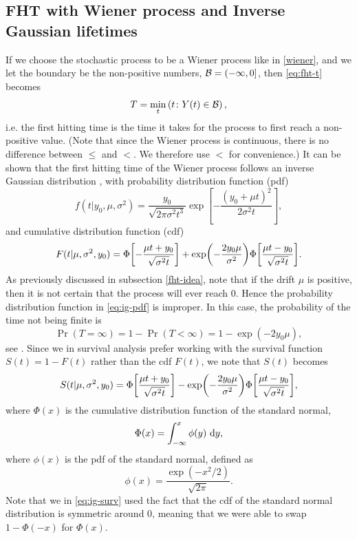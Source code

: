 \subsection{FHT with Wiener process and Inverse Gaussian lifetimes}
If we choose the stochastic process to be a Wiener process like in \eqref{wiener}, and we let the boundary be the non-positive numbers, $\mathcal{B}=(-\infty,0]$, then \eqref{eq:fht-t} becomes
\begin{equation}
    T=\min_t\left(t\colon Y(t)\in\mathcal{B}\right),
\end{equation}
i.e. the first hitting time is the time it takes for the process to first reach a non-positive value.
(Note that since the Wiener process is continuous, there is no difference between $\leq$ and $<$. We therefore use $<$ for convenience.)
It can be shown that the first hitting time of the Wiener process follows an inverse Gaussian distribution \citep{chhikara1988}, with probability distribution function (pdf)
\begin{equation}
\label{eq:ig-pdf}
    f(t|y_0,\mu,\sigma^2)=\frac{y_0}{\sqrt{2\pi\sigma^2t^3}}\exp\left[-\frac{(y_0+\mu t)^2}{2\sigma^2t}\right],
\end{equation}
and cumulative distribution function (cdf)
\begin{equation}
\label{eq:ig-cdf}
    F(t|\mu,\sigma^2,y_0)=\Phi\sqb*{-\frac{\mu t+y_0}{\sqrt{\sigma^2t}}}+\exp\p*{-\frac{2y_0\mu}{\sigma^2}}\Phi\sqb*{\frac{\mu t-y_0}{\sqrt{\sigma^2t}}}.
\end{equation}
As previously discussed in subsection \ref{fht-idea}, note that if the drift $\mu$ is positive, then it is not certain that the process will ever reach 0. Hence the probability distribution function in \eqref{eq:ig-pdf} is improper. In this case, the probability of the time not being finite is
\begin{equation*}
    \Pr{(T=\infty)}=1-\Pr{(T<\infty)}=1-\exp{(-2y_0\mu)},
\end{equation*}
see \citet{cox1965}. Since we in survival analysis prefer working with the survival function $S(t)=1-F(t)$ rather than the cdf $F(t)$, we note that $S(t)$ becomes
\begin{equation}
\label{eq:ig-surv}
    S(t|\mu,\sigma^2,y_0)=\Phi\sqb*{\frac{\mu t+y_0}{\sqrt{\sigma^2t}}}-\exp\p*{-\frac{2y_0\mu}{\sigma^2}}\Phi\sqb*{\frac{\mu t-y_0}{\sqrt{\sigma^2t}}},
\end{equation}
where $\Phi(x)$ is the cumulative distribution function of the standard normal,
\begin{equation*}
    \Phi(x)=\int_{-\infty}^x\phi(y)\text{~d}y,
\end{equation*}
where $\phi(x)$ is the pdf of the standard normal, defined as
\begin{equation}
    \phi(x)=\frac{\exp\left(-x^2/2\right)}{\sqrt{2\pi}}.
\end{equation}
Note that we in \eqref{eq:ig-surv} used the fact that the cdf of the standard normal distribution is symmetric around 0,
meaning that we were able to swap $1-\Phi(-x)$ for $\Phi(x)$.

